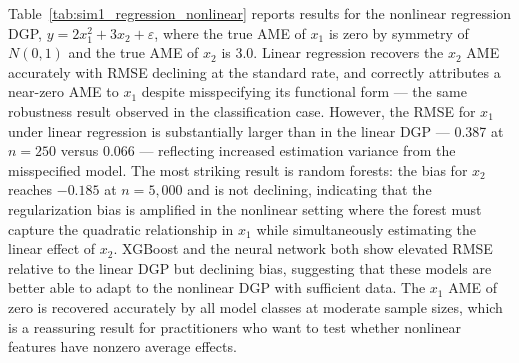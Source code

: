 \documentclass[12pt,a4paper]{article}
\numberwithin{equation}{section}
\theoremstyle{plain}
\theoremstyle{definition}
\begin{document}
	Table~\ref{tab:sim1_regression_nonlinear} reports results for the nonlinear regression DGP, $y = 2x_1^2 + 3x_2 + \varepsilon$, where the true AME of $x_1$ is zero by symmetry of $N(0,1)$ and the true AME of $x_2$ is 3.0. Linear regression recovers the $x_2$ AME accurately with RMSE declining at the standard rate, and correctly attributes a near-zero AME to $x_1$ despite misspecifying its functional form --- the same robustness result observed in the classification case. However, the RMSE for $x_1$ under linear regression is substantially larger than in the linear DGP --- 0.387 at $n=250$ versus 0.066 --- reflecting increased estimation variance from the misspecified model. The most striking result is random forests: the bias for $x_2$ reaches $-0.185$ at $n=5{,}000$ and is not declining, indicating that the regularization bias is amplified in the nonlinear setting where the forest must capture the quadratic relationship in $x_1$ while simultaneously estimating the linear effect of $x_2$. XGBoost and the neural network both show elevated RMSE relative to the linear DGP but declining bias, suggesting that these models are better able to adapt to the nonlinear DGP with sufficient data. The $x_1$ AME of zero is recovered accurately by all model classes at moderate sample sizes, which is a reassuring result for practitioners who want to test whether nonlinear features have nonzero average effects.
	
\end{document}
